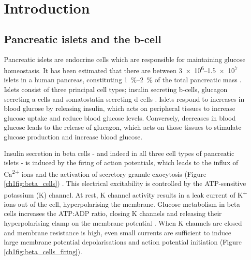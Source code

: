 \chapter{\label{ch:1-intro}Introduction} 

\graphicspath{{figures/ch1/}}

\minitoc

\section{Pancreatic islets and the \textgreek{b}-cell}

Pancreatic islets are endocrine cells which are responsible for maintaining glucose homeostasis.
It has been estimated that there are between \numrange{3e6}{1.5e7} islets in a human pancreas, constituting \SIrange{1}{2}{\percent} of the total pancreatic mass \cite{da_silva_xavier_cells_2018}.
Islets consist of three principal cell types; insulin secreting \textgreek{b}-cells, glucagon secreting \textgreek{a}-cells and somatostatin secreting \textgreek{d}-cells \cite{ashcroft_katp_2013}.
Islets respond to increases in blood glucose by releasing insulin, which acts on peripheral tissues to increase glucose uptake and reduce blood glucose levels.
Conversely, decreases in blood glucose leads to the release of glucagon, which acts on those tissues to stimulate glucose production and increase blood glucose.

Insulin secretion in beta cells - and indeed in all three cell types of pancreatic islets - is induced by the firing of action potentials, which leads to the influx of Ca\textsuperscript{2+} ions and the activation of secretory granule exocytosis (Figure \ref{ch1fig:beta_cells}) \cite{ashcroft_katp_2013}.
This electrical excitability is controlled by the ATP-sensitive potassium (K\ATP{}) channel.
At rest, K\ATP{} channel activity results in a leak current of K\textsuperscript{+} ions out of the cell, hyperpolarising the membrane.
Glucose metabolism in beta cells increases the ATP:ADP ratio, closing K\ATP{} channels and releasing their hyperpolarising clamp on the membrane potential \cite{ashcroft_glucose_1984-1, rorsman_glucose_1985-1}.
When K\ATP{} channels are closed and membrane resistance is high, even small currents are sufficient to induce large membrane potential depolarisations and action potential initiation (Figure \ref{ch1fig:beta_cells_firing}).

